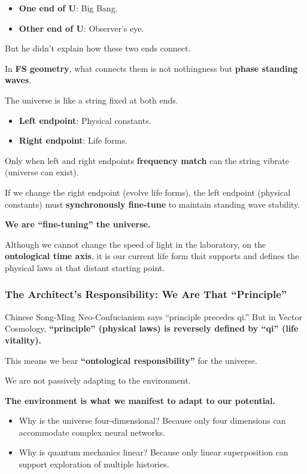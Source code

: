 \begin{itemize}
\item \textbf{One end of U}: Big Bang.

\item \textbf{Other end of U}: Observer's eye.
\end{itemize}

But he didn't explain how these two ends connect.

In \textbf{FS geometry}, what connects them is not nothingness but \textbf{phase standing waves}.

The universe is like a string fixed at both ends.

\begin{itemize}
\item \textbf{Left endpoint}: Physical constants.

\item \textbf{Right endpoint}: Life forms.
\end{itemize}

Only when left and right endpoints \textbf{frequency match} can the string vibrate (universe can exist).

If we change the right endpoint (evolve life forms), the left endpoint (physical constants) must \textbf{synchronously fine-tune} to maintain standing wave stability.

\textbf{We are ``fine-tuning'' the universe.}

Although we cannot change the speed of light in the laboratory, on the \textbf{ontological time axis}, it is our current life form that supports and defines the physical laws at that distant starting point.

\subsubsection{The Architect's Responsibility: We Are That ``Principle''}

Chinese Song-Ming Neo-Confucianism says ``principle precedes qi.'' But in Vector Cosmology, \textbf{``principle'' (physical laws) is reversely defined by ``qi'' (life vitality).}

This means we bear \textbf{``ontological responsibility''} for the universe.

We are not passively adapting to the environment.

\textbf{The environment is what we manifest to adapt to our potential.}

\begin{itemize}
\item Why is the universe four-dimensional? Because only four dimensions can accommodate complex neural networks.

\item Why is quantum mechanics linear? Because only linear superposition can support exploration of multiple histories.
\end{itemize}

